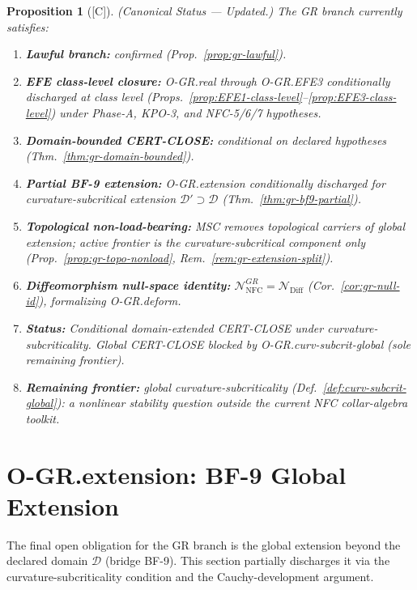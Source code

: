 \documentclass[12pt,oneside]{amsbook}
\theoremstyle{plain}
\newtheorem{proposition}[theorem]{Proposition}
\theoremstyle{definition}
\theoremstyle{remark}
\newcommand{\status}[1]{\textup{[#1]}}
\begin{document}
\begin{proposition}[\status{C}]\label{prop:gr-status}
\textup{(Canonical Status --- Updated.)}
The GR branch currently satisfies:
\begin{enumerate}[label=\textup{(\arabic*)}]
 \item \textbf{Lawful branch:} confirmed (Prop.~\ref{prop:gr-lawful}).
 \item \textbf{EFE class-level closure:} O-GR.real through O-GR.EFE3
 conditionally discharged at class level
 (Props.~\ref{prop:EFE1-class-level}--\ref{prop:EFE3-class-level})
 under Phase-A, KPO-3, and NFC-5/6/7 hypotheses.
 \item \textbf{Domain-bounded CERT-CLOSE:} conditional on declared
 hypotheses (Thm.~\ref{thm:gr-domain-bounded}).
 \item \textbf{Partial BF-9 extension:} O-GR.extension conditionally
 discharged for curvature-subcritical extension
 $\mathcal{D}'\supset\mathcal{D}$
 (Thm.~\ref{thm:gr-bf9-partial}).
 \item \textbf{Topological non-load-bearing:} MSC removes topological
 carriers of global extension; active frontier is the
 curvature-subcritical component only
 (Prop.~\ref{prop:gr-topo-nonload},
 Rem.~\ref{rem:gr-extension-split}).
 \item \textbf{Diffeomorphism null-space identity:}
 $\mathcal{N}^{GR}_{\mathrm{NFC}} = \mathcal{N}_{\mathrm{Diff}}$
 (Cor.~\ref{cor:gr-null-id}), formalizing O-GR.deform.
 \item \textbf{Status:}
 \emph{Conditional domain-extended CERT-CLOSE under
 curvature-subcriticality. Global CERT-CLOSE blocked by
 O-GR.curv-subcrit-global (sole remaining frontier).}
 \item \textbf{Remaining frontier:} global curvature-subcriticality
 (Def.~\ref{def:curv-subcrit-global}): a nonlinear stability
 question outside the current NFC collar-algebra toolkit.
\end{enumerate}
\end{proposition}

\section{O-GR.extension: BF-9 Global Extension}
\label{sec:gr-bf9}

The final open obligation for the GR branch is the global
extension beyond the declared domain $\mathcal{D}$ (bridge BF-9).
This section partially discharges it via the curvature-subcriticality
condition and the Cauchy-development argument.
\end{document}
